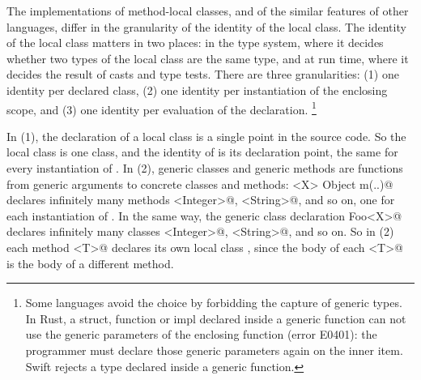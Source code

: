 The implementations of method-local classes, and of the similar features of other languages, differ in the granularity of the identity of the local class.
The identity of the local class matters in two places:
in the type system, where it decides whether two types of the local class are the same type,
and at run time, where it decides the result of casts and type tests.
There are three granularities: (1) one identity per declared class, (2) one identity per instantiation of the enclosing scope, and (3) one identity per evaluation of the declaration.%
\footnote{Some languages avoid the choice by forbidding the capture of generic types.
In Rust, a struct, function or impl declared inside a generic function can not use the generic parameters of the enclosing function (error E0401):
the programmer must declare those generic parameters again on the inner item.
Swift rejects a type declared inside a generic function.
}

In (1), the declaration of a local class is a single point in the source code.
So the local class \Q@MyFoo@ is one class, and the identity of \Q@MyFoo@ is its declaration point, the same for every instantiation of \Q@m@.
In (2), generic classes and generic methods are functions from generic arguments to concrete classes and methods:
\Q@static <X> Object m(..)@ declares infinitely many methods \Q@m<Integer>@, \Q@m<String>@, and so on, one for each instantiation of \Q@X@.
In the same way, the generic class declaration \Q@class Foo<X>@ declares infinitely many classes \Q@Foo<Integer>@, \Q@Foo<String>@, and so on.
So in (2) each method \Q@m<T>@ declares its own local class \Q@MyFoo@, since the body of each \Q@m<T>@ is the body of a different method.

